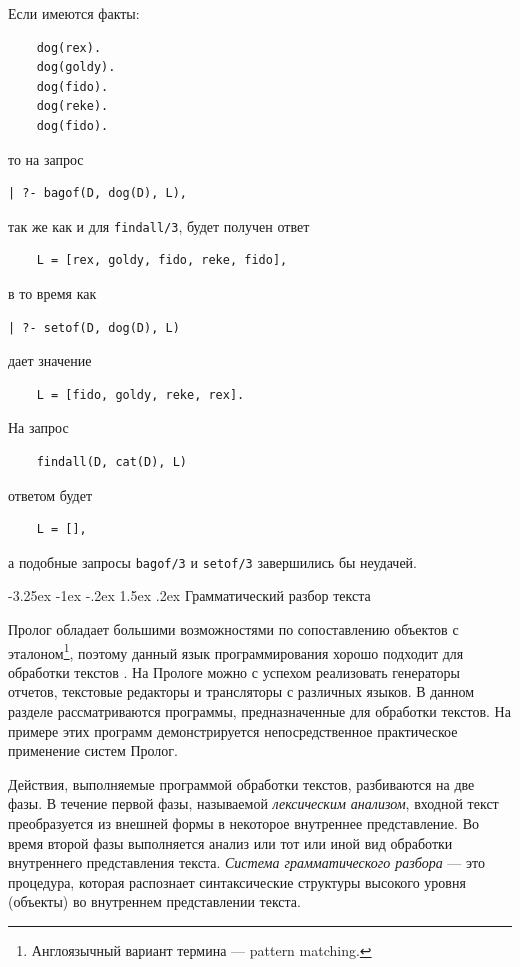 \documentclass[12pt, openany, twoside]{book} %
\makeatletter
\renewcommand\section{\@startsection {section}{1}{\z@}%
                                   {-3.25ex \@plus -1ex \@minus -.2ex}%
                                   {1.5ex \@plus.2ex}%
                                   {\normalfont\large\bfseries}}
\makeatother
\begin{document}
Если имеются факты:

{\tt\begin{verbatim}
    dog(rex).
    dog(goldy).
    dog(fido).
    dog(reke).
    dog(fido).
\end{verbatim}}

\noindent то на запрос

{\tt\begin{verbatim}
| ?- bagof(D, dog(D), L),
\end{verbatim}}

\noindent так же как и для {\tt findall/3}, будет получен ответ
{\tt\begin{verbatim}
    L = [rex, goldy, fido, reke, fido],
\end{verbatim}}

\noindent в то время как

{\tt\begin{verbatim}
| ?- setof(D, dog(D), L)
\end{verbatim}}

\noindent дает значение
{\tt\begin{verbatim}
    L = [fido, goldy, reke, rex].
\end{verbatim}}

\noindent На запрос
{\tt\begin{verbatim}
    findall(D, cat(D), L)
\end{verbatim}}

\noindent ответом будет
{\tt\begin{verbatim}
    L = [],
\end{verbatim}}
\noindent а подобные запросы {\tt bagof/3} и {\tt setof/3} завершились бы неудачей.

\section{Грамматический разбор текста}

Пролог обладает большими возможностями по сопоставлению объектов с эталоном\footnote{Англоязычный вариант термина --- pattern matching.}, поэтому данный язык программирования хорошо подходит для обработки текстов \cite{Malpas}. На Прологе можно с успехом реализовать генераторы отчетов, текстовые редакторы и трансляторы с различных языков. В данном разделе рассматриваются программы, предназначенные для обработки текстов. На примере этих программ демонстрируется непосредственное практическое применение систем Пролог.

Действия, выполняемые программой обработки текстов, разбиваются на две фазы. В течение первой фазы, называемой \emph{лексическим анализом}, входной текст преобразуется из внешней формы в некоторое внутреннее представление. Во время второй фазы выполняется анализ или тот или иной вид обработки внутреннего представления текста. \emph{Система грамматического разбора} --- это процедура, которая распознает синтаксические структуры высокого уровня (объекты) во внутреннем представлении текста.
\end{document}
